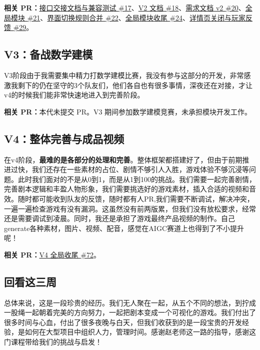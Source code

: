 \textbf{相关 PR：}\href{https://github.com/214notfound/jiedeng/pull/17}{接口交接文档与兼容测试 \#17}、\href{https://github.com/214notfound/jiedeng/pull/18}{V2 文档 \#18}、\href{https://github.com/214notfound/jiedeng/pull/20}{需求文档 v2 \#20}、\href{https://github.com/214notfound/jiedeng/pull/21}{全局模块 \#21}、\href{https://github.com/214notfound/jiedeng/pull/22}{界面切换规则合并 \#22}、\href{https://github.com/214notfound/jiedeng/pull/24}{全局模块收尾 \#24}、\href{https://github.com/214notfound/jiedeng/pull/29}{详情页关闭与玩家反馈 \#29}。

\subsection{V3：备战数学建模}

V3阶段由于我需要集中精力打数学建模比赛，我没有参与这部分的开发，非常感激我剩下的仍在坚守的3个队友们，他们各自也有很多事情，深夜还在对接，才让v4的时候我们能非常快速地进入到完善阶段。

\textbf{相关 PR：}本代未提交 PR。V3 期间参加数学建模竞赛，未承担模块开发工作。

\subsection{V4：整体完善与成品视频}

在v4阶段，\textbf{最难的是各部分的处理和完善}。整体框架都搭建好了，但由于前期推进过快，我们还存在一些素材的占位、剧情不够引人入胜，游戏体验不够沉浸等问题。此时我们面对的不是从0到1，而是从1到100的挑战。我们需要一起完善剧情，完善剧本逻辑和丰盈人物形象，我们需要挑选好的游戏素材，插入合适的视频和音效。随时都可能收到队友的反馈，随时都有人PR,我们需要不断调试，解决冲突，一遍一遍检查游戏有没有漏洞。这虽然没有前两版累，但我们没有放松要求，经常还是需要调试到凌晨。同时，我还是承担了游戏最终产品视频的制作。自己generate各种素材，图片、视频、配音，感觉在AIGC赛道上也得到了不小提升呢！

\textbf{相关 PR：}\href{https://github.com/214notfound/jiedeng/pull/72}{V4 全局收尾 \#72}。

\subsection{回看这三周}

总体来说，这是一段珍贵的经历。我们无人聚在一起，从五个不同的想法，到拧成一股绳一起朝着完美的方向努力，一起把剧本变成一个可视化的游戏。我们付出了很多时间与心血，付出了很多夜晚与白天，但我们收获到的是一段宝贵的开发经验，是如何在大型项目中组织人力，管理时间。感谢赵老师这一路的指导，感谢这门课程带给我们的挑战与启发！

